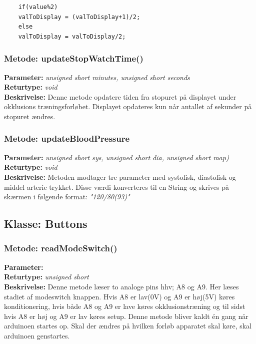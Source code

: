\begin{lstlisting}
	if(value%2)
	valToDisplay = (valToDisplay+1)/2;
	else
	valToDisplay = valToDisplay/2;
\end{lstlisting}

\subsubsection{Metode: updateStopWatchTime()}
\textbf{Parameter: } \textit{unsigned short minutes, unsigned short seconds}
\\ \textbf{Returtype: } \textit{void}
\\ \textbf{Beskrivelse: } Denne metode opdatere tiden fra stopuret på displayet under okklusions træningsforløbet. Displayet opdateres kun når antallet af sekunder på stopuret ændres. 

\subsubsection{Metode: updateBloodPressure}
\textbf{Parameter: } \textit{unsigned short sys, unsigned short dia, unsigned short map)} 
\\ \textbf{Returtype: } \textit{void}
\\ \textbf{Beskrivelse: } Metoden modtager tre parameter med systolisk, diastolisk og middel arterie trykket. Disse værdi konverteres til en String og skrives på skærmen i følgende format: \textit{"120/80(93)"}

\subsection{Klasse: Buttons}

\subsubsection{Metode: readModeSwitch()}
\textbf{Parameter: } 
\\ \textbf{Returtype: } \textit{unsigned short}
\\ \textbf{Beskrivelse: } Denne metode læser to analoge pins hhv; A8 og A9. Her læses stadiet af modeswitch knappen. Hvis A8 er lav(0V) og A9 er høj(5V) køres konditionering, hvis både A8 og A9 er lave køres okklusionstræning og til sidst hvis A8 er høj og A9 er lav køres setup. Denne metode bliver kaldt én gang når arduinoen startes op. Skal der ændres på hvilken forløb apparatet skal køre, skal arduinoen genstartes. 

